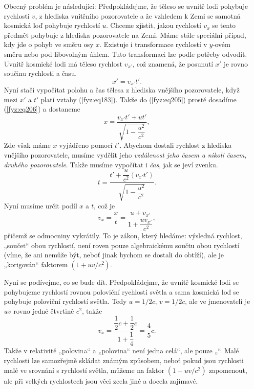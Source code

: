     Obecný problém je následující: Předpokládejme, že těleso se uvnitř lodi pohybuje rychlostí 
    \(v\), z hlediska vnitřního pozorovatele a že vzhledem k Zemi se samotná kosmická loď pohybuje 
    rychlostí \(u\). Chceme zjistit, jakou rychlostí \(v_x\) se tento předmět pohybuje z hlediska 
    pozorovatele na Zemi. Máme stále speciální případ, kdy jde o pohyb ve směru osy \(x\). Existuje 
    i transformace rychlostí v \(y\)-ovém směru nebo pod libovolným úhlem. Tuto transformaci lze 
    podle potřeby odvodit. Uvnitř kosmické lodi má těleso rychlost \(v_{x'}\), což znamená, že 
    posunutí \(x'\) je rovno součinu rychlosti a času.
    \begin{equation}\label{fyz:eq206}
      x' = v_{x'}t'. 
    \end{equation}
    Nyní stačí vypočítat polohu a čas tělesa z hlediska vnějšího pozorovatele, když mezi \(x'\) a 
    \(t'\) platí vztahy (\ref{fyz:eq183}). Takže do (\ref{fyz:eq205}) prostě dosadíme 
    (\ref{fyz:eq206}) a dostaneme
    \begin{equation}\label{fyz:eq207}
      x = \frac{v_{x'}t' + ut'}{\sqrt{1-\dfrac{u^2}{c^2}}},
    \end{equation}
    Zde však máme \(x\) vyjádřeno pomocí \(t'\). Abychom dostali rychlost z hlediska vnějšího 
    pozorovatele, musíme vydělit jeho \emph{vzdálenost jeho časem a nikoli časem, druhého 
    pozorovatele}. Takže musíme vypočítat i \emph{čas}, jak se jeví zvenku.
    \begin{equation}\label{fyz:eq208}
      t = \frac{t'+\dfrac{u}{c^2}(v_{x'}t')}{\sqrt{1-\dfrac{u^2}{c^2}}}. 
    \end{equation}
    Nyní musíme určit podíl \(x\) a \(t\), což je
    \begin{equation}\label{fyz:eq209}
      v_x = \frac{x}{t} = \frac{u+v_{x'}}{1+\dfrac{uv_{x'}}{c^2}},
    \end{equation}
    přičemž se odmocniny vykrátily. To je zákon, který hledáme: výsledná rychlost, „součet“ obou 
    rychlostí, není roven pouze algebraickému součtu obou rychlostí (víme, že ani nemůže být, neboť 
    jinak bychom se dostali do obtíží), ale je „korigován“ faktorem \((1 + uv/c^2)\).
    
    Nyní se podívejme, co se bude dít. Předpokládejme, že uvnitř kosmické lodi se pohybujeme 
    rychlostí rovnou poloviční rychlosti světla a sama kosmická loď se pohybuje poloviční rychlostí 
    světla. Tedy \(u= 1/2c\), \(v= 1/2c\), ale ve jmenovateli je \(uv\) rovno jedné čtvrtině 
    \(c^2\), takže
    \begin{equation*}
      v_x = \frac{\dfrac{1}{2}c + \dfrac{1}{2}c}{1+\dfrac{1}{4}} = \dfrac{4}{5}c.
    \end{equation*}
    Takže v relativitě „polovina“ a „polovina“ není jedna celá“, ale pouze „“. Malé
    rychlosti lze samozřejmě skládat známým způsobem, neboť pokud jsou rychlosti malé ve srovnání s
    rychlostí světla, můžeme na faktor \((1 + uv/c^2)\) zapomenout, ale při velkých rychlostech jsou
    věci zcela jiné a docela zajímavé.
    
